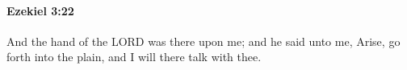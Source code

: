 
		\paragraph{Ezekiel 3:22} %
			\label{EZEKIEL-3-22}

			And the hand of the LORD was there upon me; and he said unto me, Arise, go forth into the plain, and I will there talk with thee.


